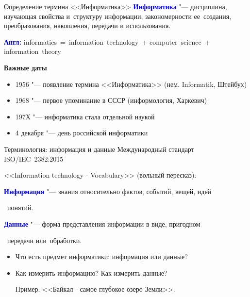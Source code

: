 \documentclass[aspectratio=169]{beamer}
\begin{document}
\begin{frame}{Определение термина <<Информатика>>}
	\textbf{\textcolor{blue}{Информатика}} "--- дисциплина, изучающая свойства и~структуру информации, закономерности ее~создания, преобразования, накопления, передачи и использования.
	
	\vspace{0.5cm}

	\textbf{\textcolor{blue}{Англ:}} informatics~=~information~technology~+ computer~science~+ information~theory

	\begin{center}
		\textbf{Важные даты}
	\end{center}

	\begin{itemize}
		\item 1956 "--- появление термина <<Информатика>> (нем. Informatik, Штейбух)
		\item 1968 "--- первое упоминание в СССР (информология, Харкевич)
		\item 197Х "--- информатика стала отдельной наукой
		\item 4 декабря "--- день российской информатики
	\end{itemize}
\end{frame}

\begin{frame}{Терминология: информация и данные}
	Международный стандарт ISO/IEC~2382:2015
	
	<<Information technology - Vocabulary>> (вольный пересказ):

		\vspace{0.3cm}

		\quad\quad\textbf{\textcolor{blue}{Информация}} "--- знания относительно фактов, событий, вещей, идей 

		\quad{}~понятий.
		
		\vspace{0.3cm}

		\quad\quad\textbf{\textcolor{blue}{Данные}} "--- форма представления информации в виде, пригодном 

		\quad{}~передачи или~обработки.

	\vspace{0.5cm}

	\begin{itemize}
		\item Что есть предмет информатики: информация или данные?
		\item 
			Как измерить информацию? Как измерить данные?
			
			Пример: <<Байкал - самое глубокое озеро Земли>>.
	\end{itemize}
\end{frame}
\end{document}
